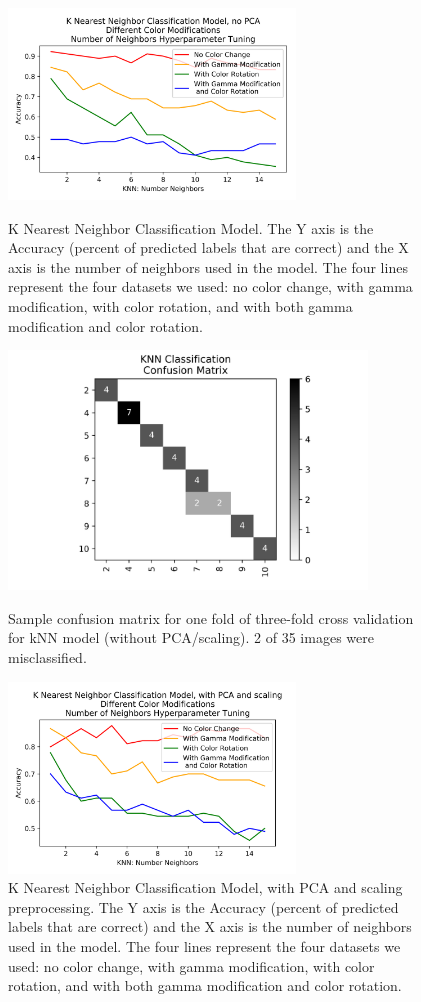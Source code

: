 \documentclass[journal]{IEEEtran}
\begin{document}
\begin{figure}
\centering
\includegraphics[height=2in]{KNN_clf_noPCA/knn_classification.png}
\caption{K Nearest Neighbor Classification Model. The Y axis is the Accuracy (percent of predicted labels that are correct) and the X axis is the number of neighbors used in the model. The four lines represent the four datasets we used: no color change, with gamma modification, with color rotation, and with both gamma modification and color rotation.}
\label{knn}

\centering
\includegraphics[height=2.5in]{KNN_clf_noPCA/KNN_classification_cfm.png}
\caption{Sample confusion matrix for one fold of three-fold cross validation for kNN model (without PCA/scaling). 2 of 35 images were misclassified.}
\label{knn_confusion}

\centering
\includegraphics[height=2in]{KNN_clf_PCA/knn_classification.png}
\caption{K Nearest Neighbor Classification Model, with PCA and scaling preprocessing. The Y axis is the Accuracy (percent of predicted labels that are correct) and the X axis is the number of neighbors used in the model. The four lines represent the four datasets we used: no color change, with gamma modification, with color rotation, and with both gamma modification and color rotation.}
\label{knn_pca}
\end{figure}
\end{document}
